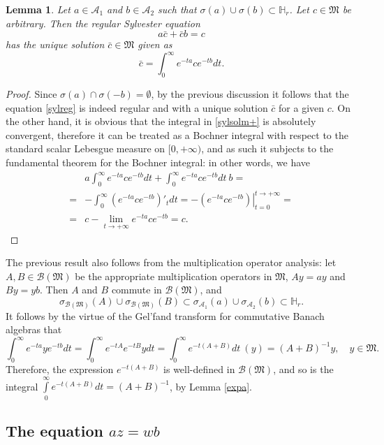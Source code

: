\documentclass{article}
\newtheorem{lemma}{Lemma}[section]
\theoremstyle{definition}
\def\A{{\mathcal{A}}}
\def\B{{\mathcal{B}}}
\def\M{\mathfrak{M}}
\def\HR{\mathbb{H}_r}
\begin{document}
\begin{lemma}\label{regeq} Let $a\in\A_1$ and $b\in\A_2$ such that $\sigma(a)\cup\sigma(b)\subset\HR$. Let $c\in\M$ be arbitrary. Then the regular Sylvester equation
\begin{equation}
\label{sylreg}
a\bar{c}+\bar{c}b=c
\end{equation}
has the unique solution $\bar{c}\in\M$ given as
\begin{equation}
\label{sylsolm+}
\bar{c}=\int_0^\infty e^{-ta}ce^{-tb}dt. 
\end{equation}
\end{lemma}
\begin{proof} Since $\sigma(a)\cap\sigma(-b)=\emptyset$, by the previous discussion it follows that the equation \eqref{sylreg} is indeed regular and with a unique solution $\bar{c}$ for a given $c$. On the other hand, it is obvious that the integral in \eqref{sylsolm+} is absolutely convergent, therefore it can be treated as a Bochner integral with respect to the standard scalar Lebesgue measure on $[0,+\infty)$, and as such it subjects to the fundamental theorem for the Bochner integral: in other words, we have 
$$
\begin{aligned}
&a\int_0^\infty e^{-ta}ce^{-tb}dt+\int_0^\infty e^{-ta}ce^{-tb}dt\ b=\\
=&-\int_0^\infty\left( e^{-ta}ce^{-tb}\right)'_t dt=-\left.\left(e^{-ta}ce^{-tb}\right)\right|_{t=0}^{t\to+\infty}=\\
=&c-\lim_{t\to+\infty}e^{-ta}ce^{-tb}=c.
\end{aligned}$$
\end{proof}
The previous result also follows from the multiplication operator analysis: let $A, B\in\B(\M)$ be the appropriate multiplication operators in $\M$, $Ay=ay$ and $By=yb$. Then $A$ and $B$ commute in $\B(\M)$, and  $$\sigma_{\B(\M)}(A)\cup \sigma_{\B(\M)}(B)\subset\sigma_{\A_1}(a)\cup\sigma_{\A_2}(b)\subset\HR.$$
It follows by the virtue of the Gel'fand transform for commutative Banach algebras that 
$$\int_0^\infty e^{-ta}ye^{-tb}dt=\int_0^\infty e^{-tA}e^{-tB}ydt=\int_0^\infty e^{-t(A+B)}dt\ (y)=(A+B)^{-1}y,\quad y\in\M.$$
Therefore, the expression  $e^{-t(A+B)}$ is well-defined in $\B(\M)$, and so is the integral $\int\limits_0^\infty e^{-t(A+B)}dt=(A+B)^{-1}$, by Lemma \ref{expa}. 

\subsection{The equation $az=wb$}
\end{document}

